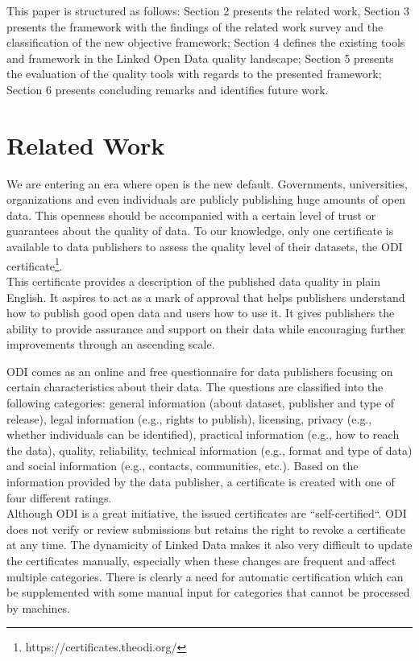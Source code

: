 \documentclass[onecolumn, crcready]{iosart2c}
\begin{document}
This paper is structured as follows: Section 2 presents the related work, Section 3 presents the framework with the findings of the related work survey and the classification of the new objective framework; Section 4 defines the existing tools and framework in the Linked Open Data quality landscape; Section 5 presents the evaluation of the quality tools with regards to the presented framework; Section 6 presents concluding remarks and identifies future work.

\section{Related Work}
We are entering an era where open is the new default. Governments, universities, organizations and even individuals are publicly publishing huge amounts of open data.  This openness should be accompanied with a certain level of trust or guarantees about the quality of data.  To our knowledge, only one certificate is available to data publishers to assess the quality level of their datasets, the ODI certificate\footnote {https://certificates.theodi.org/}.\\

This certificate provides a description of the published data quality in plain English. It aspires to act as a mark of approval that helps publishers understand how to publish good open data and users how to use it. It gives publishers the ability to provide assurance and support on their data while encouraging further improvements through an ascending scale.

ODI comes as an online and free questionnaire for data publishers focusing on certain characteristics about their data. The questions are classified into the following categories: general information (about dataset, publisher and type of release), legal information (e.g., rights to publish), licensing, privacy (e.g., whether individuals can be identified), practical information (e.g., how to reach the data), quality, reliability, technical information (e.g., format and type of data) and social information (e.g., contacts, communities, etc.). Based on the information provided  by the data  publisher,  a certificate  is created  with one of four different ratings.\\

Although ODI is a great initiative, the issued certificates are “self-certified“. ODI does not verify or review submissions but retains the right to revoke a certificate at any time. The dynamicity of Linked Data  makes it also very difficult to update the certificates manually, especially when these changes are frequent and affect multiple categories. There is clearly a need for automatic certification which can be supplemented with some manual input for categories that cannot be processed by machines.\\
\end{document}
